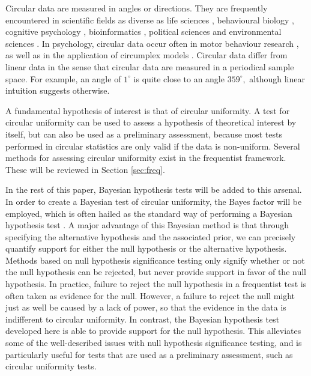 
Circular data are measured in angles or directions. They are frequently encountered in scientific fields as diverse as life sciences \citep{mardianew}, behavioural biology \citep{bulbert2015danger}, cognitive psychology \citep{kaas2006haptic}, bioinformatics \citep{mardia2008multivariate}, political sciences \citep{gill2010} and environmental sciences \citep{arnold2006recent}. In psychology, circular data occur often in motor behaviour research \citep{mechsner2001perceptual, mechsner2007bimanual, postma2008keep, baayen2012test}, as well as in the application of circumplex models \citep{gurtman2003circumplex, gurtman2009exploring, Leary1957}. Circular data differ from linear data in the sense that circular data are measured in a periodical sample space. For example, an angle of $1^{\circ}$ is quite close to an angle $359^{\circ},$ although linear intuition suggests otherwise.

A fundamental hypothesis of interest is that of circular uniformity. A test for circular uniformity can be used to assess a hypothesis of theoretical interest by itself, but can also be used as a preliminary assessment, because most tests performed in circular statistics are only valid if the data is non-uniform. Several methods for assessing circular uniformity exist in the frequentist framework. These will be reviewed in Section \ref{sec:freq}.

In the rest of this paper, Bayesian hypothesis tests will be added to this arsenal. In order to create a Bayesian test of circular uniformity, the Bayes factor will be employed, which is often hailed as the standard way of performing a Bayesian hypothesis test \citep{kass1995bayes, jeffreys1961theory}. A major advantage of this Bayesian method is that through  specifying the alternative hypothesis and the associated prior, we can precisely quantify support for either the null hypothesis or the alternative hypothesis. Methods based on null hypothesis significance testing only signify whether or not the null hypothesis can be rejected, but never provide support in favor of the null hypothesis. In practice, failure to reject the null hypothesis in a frequentist test is often taken as evidence for the null. However, a failure to reject the null might just as well be caused by a lack of power, so that the evidence in the data is indifferent to circular uniformity. In contrast, the Bayesian hypothesis test developed here is able to provide support for the null hypothesis. This alleviates some of the well-described issues with null hypothesis significance testing, and is particularly useful for tests that are used as a preliminary assessment, such as circular uniformity tests. 

